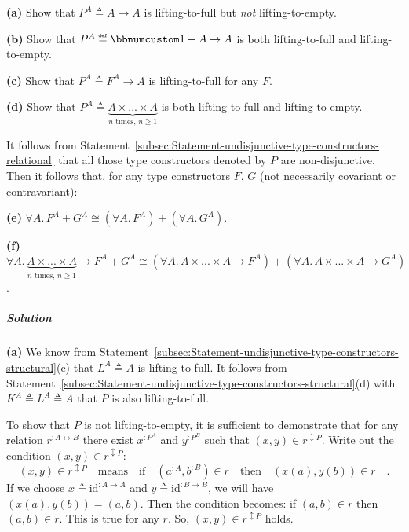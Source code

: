 \textbf{(a)} Show that $P^{A}\triangleq A\rightarrow A$ is lifting-to-full
but \emph{not} lifting-to-empty.

\textbf{(b)} Show that $P^{A}\triangleq\bbnum 1+A\rightarrow A$ is
both lifting-to-full and lifting-to-empty.

\textbf{(c)} Show that $P^{A}\triangleq F^{A}\rightarrow A$ is lifting-to-full
for any $F$.

\textbf{(d)} Show that $P^{A}\triangleq\underbrace{A\times...\times A}_{n\text{ times, }n\geq1}$
is both lifting-to-full and lifting-to-empty.

It follows from Statement~\ref{subsec:Statement-undisjunctive-type-constructors-relational}
that all those type constructors denoted by $P$ are non-disjunctive.
Then it follows that, for any type constructors $F$, $G$ (not necessarily
covariant or contravariant):

\textbf{(e)} $\forall A.\,F^{A}+G^{A}\cong(\forall A.\,F^{A})+(\forall A.\,G^{A})$.

\textbf{(f)} $\forall A.\,\underbrace{A\times...\times A}_{n\text{ times, }n\geq1}\rightarrow F^{A}+G^{A}\cong(\forall A.\,A\times...\times A\rightarrow F^{A})+(\forall A.\,A\times...\times A\rightarrow G^{A})$.

\subparagraph{Solution}

\textbf{(a)} We know from Statement~\ref{subsec:Statement-undisjunctive-type-constructors-structural}(c)
that $L^{A}\triangleq A$ is lifting-to-full. It follows from Statement~\ref{subsec:Statement-undisjunctive-type-constructors-structural}(d)
with $K^{A}\triangleq L^{A}\triangleq A$ that $P$ is also lifting-to-full.

To show that $P$ is not lifting-to-empty, it is sufficient to demonstrate
that for any relation $r^{:A\leftrightarrow B}$ there exist $x^{:P^{A}}$
and $y^{:P^{B}}$ such that $(x,y)\in r^{\updownarrow P}$. Write
out the condition $(x,y)\in r^{\updownarrow P}$:
\[
(x,y)\in r^{\updownarrow P}\quad\text{means}\quad\text{if}\quad(a^{:A},b^{:B})\in r\quad\text{then}\quad(x(a),y(b))\in r\quad.
\]
If we choose $x\triangleq\text{id}^{:A\rightarrow A}$ and $y\triangleq\text{id}^{:B\rightarrow B}$,
we will have $(x(a),y(b))=(a,b)$. Then the condition becomes: if
$(a,b)\in r$ then $(a,b)\in r$. This is true for any $r$. So, $(x,y)\in r^{\updownarrow P}$
holds.

